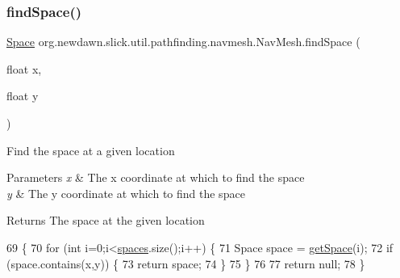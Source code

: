 \subsubsection{\texorpdfstring{find\+Space()}{findSpace()}}
{\footnotesize\ttfamily \mbox{\hyperlink{classorg_1_1newdawn_1_1slick_1_1util_1_1pathfinding_1_1navmesh_1_1_space}{Space}} org.\+newdawn.\+slick.\+util.\+pathfinding.\+navmesh.\+Nav\+Mesh.\+find\+Space (\begin{DoxyParamCaption}\item[{float}]{x,  }\item[{float}]{y }\end{DoxyParamCaption})\hspace{0.3cm}{\ttfamily [inline]}}

Find the space at a given location


\begin{DoxyParams}{Parameters}
{\em x} & The x coordinate at which to find the space \\
\hline
{\em y} & The y coordinate at which to find the space \\
\hline
\end{DoxyParams}
\begin{DoxyReturn}{Returns}
The space at the given location 
\end{DoxyReturn}

\begin{DoxyCode}
69                                              \{
70         \textcolor{keywordflow}{for} (\textcolor{keywordtype}{int} i=0;i<\mbox{\hyperlink{classorg_1_1newdawn_1_1slick_1_1util_1_1pathfinding_1_1navmesh_1_1_nav_mesh_a753a5f03305449a3c61d01a41c2fb129}{spaces}}.size();i++) \{
71             Space space = \mbox{\hyperlink{classorg_1_1newdawn_1_1slick_1_1util_1_1pathfinding_1_1navmesh_1_1_nav_mesh_a261df818d2d9a983c1b9771589b03e25}{getSpace}}(i);
72             \textcolor{keywordflow}{if} (space.contains(x,y)) \{
73                 \textcolor{keywordflow}{return} space;
74             \}
75         \}
76         
77         \textcolor{keywordflow}{return} null;
78     \}
\end{DoxyCode}
\mbox{\label{classorg_1_1newdawn_1_1slick_1_1util_1_1pathfinding_1_1navmesh_1_1_nav_mesh_a261df818d2d9a983c1b9771589b03e25}} 
